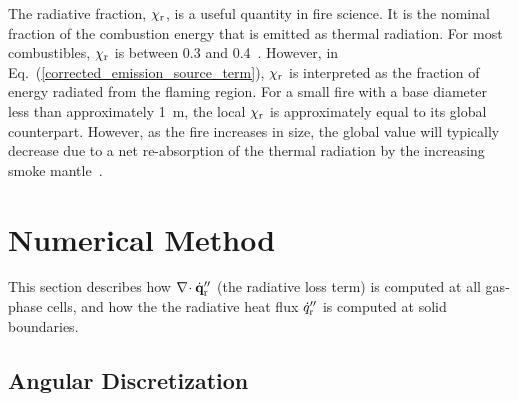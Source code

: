 The radiative fraction, $\chi_{\rm r}$, is a useful quantity in fire science. It is the nominal fraction of the combustion energy that is emitted as thermal radiation. For most combustibles, $\chi_{\rm r}$ is between 0.3 and 0.4~\cite{Beyler2:SFPE}. However, in Eq.~(\ref{corrected_emission_source_term}), $\chi_{\rm r}$ is interpreted as the fraction of energy radiated from the flaming region.  For a small fire with a base diameter less than approximately 1~m, the local $\chi_{\rm r}$ is approximately equal to its global counterpart. However, as the fire increases in size, the global value will typically decrease due to a net re-absorption of the thermal radiation by the increasing smoke mantle~\cite{Takahashi:1}.



\section{Numerical Method}
\label{radnumericalmethodsection}

This section describes how $\nabla\!\cdot \dot{\mathbf{q}}_{\rm r}''$ (the radiative loss
term) is computed at all gas-phase cells, and how the
the radiative heat flux $\dot{q}_{\rm r}''$ is computed at solid boundaries.

\subsection{Angular Discretization}
\label{radiation-discre}


